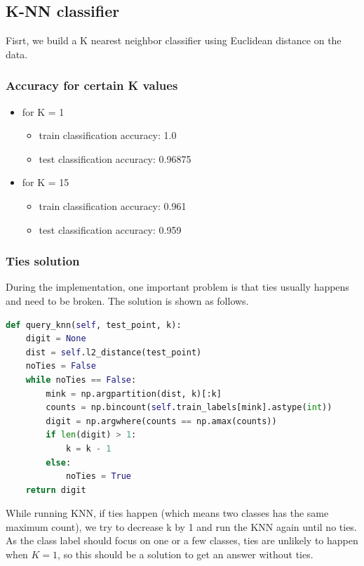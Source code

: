 \documentclass[a4paper]{article}
\begin{document}
\subsection{K-NN classifier}

Fisrt, we build a K nearest neighbor classifier using Euclidean distance on the data.

\subsubsection{Accuracy for certain K values}

\begin{itemize}
    \item for K = 1
    \begin{itemize}
        \item train classification accuracy: 1.0
        \item test classification accuracy: 0.96875
    \end{itemize}
    \item for K = 15
    \begin{itemize}
        \item train classification accuracy: 0.961
        \item test classification accuracy: 0.959
    \end{itemize}
\end{itemize}

\subsubsection{Ties solution}

During the implementation, one important problem is that ties usually happens and need to be broken. The solution is shown as follows.

\begin{lstlisting}[language = Python]
def query_knn(self, test_point, k):
    digit = None
    dist = self.l2_distance(test_point)
    noTies = False
    while noTies == False:
        mink = np.argpartition(dist, k)[:k]
        counts = np.bincount(self.train_labels[mink].astype(int))
        digit = np.argwhere(counts == np.amax(counts))
        if len(digit) > 1:
            k = k - 1
        else:
            noTies = True
    return digit
\end{lstlisting}

While running KNN, if ties happen (which means two classes has the same maximum count), we try to decrease k by 1 and run the KNN again until no ties. As the class label should focus on one or a few classes, ties are unlikely to happen when $K=1$, so this should be a solution to get an answer without ties.
\end{document}
